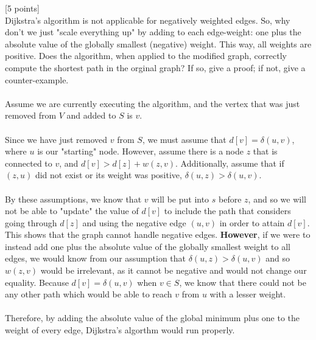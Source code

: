 \documentclass[12pt]{article}
\newcounter{ques}
\newenvironment{question}{\stepcounter{ques}{\noindent\bf Question \arabic{ques}:}}{\vspace{5mm}}
\begin{document}
\begin{question}[5 points]\\
Dijkstra's algorithm is not applicable  for negatively weighted edges. So, why don't we just "scale everything up" by adding to each edge-weight: one plus  the absolute value of the globally smallest (negative) weight. This way, all weights are positive. Does the algorithm, when applied to the modified graph,  correctly compute the shortest path in the orginal graph? If so, give a proof;   if not, give a counter-example.\\\\

Assume we are currently executing the algorithm, and the vertex that was just removed from $V$ and added to $S$ is $v$.\\\\
Since we have just removed $v$ from $S$, we must assume that $d[v]=\delta(u,v)$, where $u$ is our "starting" node. However, assume there is a node $z$ that is connected to $v$, and  $d[v] > d[z] + w(z,v)$. Additionally, assume that if $(z,u)$ did not exist or its weight was positive, $\delta(u,z)>\delta(u,v)$.\\\\
By these assumptions, we know that $v$ will be put into $s$ before $z$, and so we will not be able to "update" the value of $d[v]$ to include the path that considers going through $d[z]$ and using the negative edge $(u,v)$ in order to attain $d[v]$. This shows that the graph cannot handle negative edges. \textbf{However}, if we were to instead add one plus the absolute value of the globally smallest weight to all edges, we would know from our assumption that $\delta(u,z)>\delta(u,v)$ and so $w(z,v)$ would be irrelevant, as it cannot be negative and would not change our equality. Because $d[v]=\delta(u,v)$ when $v\in S$, we know that there could not be any other path which would be able to reach $v$ from $u$ with a lesser weight.\\\\
Therefore, by adding the absolute value of the global minimum plus one to the weight of every edge, Dijkstra's algorthm would run properly.

%





\end{question}
\end{document}
